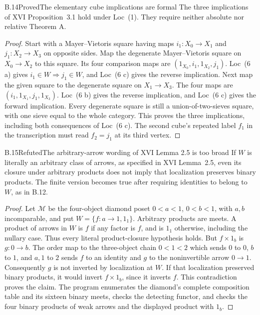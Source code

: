 \begin{claim}{B.14}{Proved}{The elementary cube implications are formal}
The three implications of XVI Proposition~3.1 hold under Loc~(1).
They require neither absolute nor relative Theorem A.
\end{claim}
\begin{proof}
Start with a Mayer--Vietoris square having maps
$i_1:X_0\to X_1$ and $j_1:X_2\to X_3$ on opposite sides.
Map the degenerate Mayer--Vietoris square on $X_0\to X_2$
to this square. Its four comparison maps are
$(1_{X_0},i_1,1_{X_2},j_1)$. Loc~(6 a) gives
$i_1\in W\Rightarrow j_1\in W$, and Loc~(6 c) gives
the reverse implication. Next map the given square to the
degenerate square on $X_1\to X_3$. The four maps are
$(i_1,1_{X_1},j_1,1_{X_3})$. Loc~(6 b) gives the reverse
implication, and Loc~(6 c) gives the forward implication.
Every degenerate square is still a union-of-two-sieves square,
with one sieve equal to the whole category. This proves the
three implications, including both consequences of Loc~(6 c).
The second cube's repeated label $f_1$ in the transcription must
read $f_2=j_1$ at its third vertex.
\end{proof}

\begin{claim}{B.15}{Refuted}{The arbitrary-arrow wording of XVI Lemma 2.5 is too broad}
If $W$ is literally an arbitrary class of arrows, as specified in
XVI Lemma~2.5, even its closure under arbitrary products does not
imply that localization preserves binary products. The finite version becomes
true after requiring identities to belong to $W$, as in B.12.
\end{claim}
\begin{proof}
Let $\mathcal M$ be the four-object diamond poset
$0<a<1$, $0<b<1$, with $a,b$ incomparable, and put
$W=\{f:a\to1,1_1\}$. Arbitrary products are meets. A product of
arrows in $W$ is $f$ if any factor is $f$, and is $1_1$ otherwise,
including the nullary case. Thus every literal product-closure
hypothesis holds. But $f\times1_b$ is
$g:0\to b$. The order map to the three-object chain $0<1<2$ which
sends $0$ to $0$, $b$ to $1$, and $a,1$ to $2$ sends $f$ to an
identity and $g$ to the noninvertible arrow $0\to1$.
Consequently $g$ is not inverted by localization at $W$.
If that localization preserved binary products, it would invert
$f\times1_b$, since it inverts $f$. This contradiction proves the
claim. The program enumerates the diamond's complete composition
table and its sixteen binary meets, checks the detecting functor,
and checks the four binary products of weak arrows and the
displayed product with $1_b$.
\end{proof}

